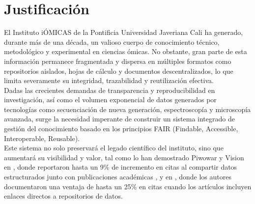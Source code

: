 \section{Justificación}
El Instituto iÓMICAS de la Pontificia Universidad Javeriana Cali ha generado, durante más de una década, un valioso cuerpo de conocimiento técnico, metodológico y experimental en ciencias ómicas. No obstante, gran parte de esta información permanece fragmentada y dispersa en múltiples formatos como repositorios aislados, hojas de cálculo y documentos descentralizados, lo que limita severamente su integridad, trazabilidad y reutilización efectiva.\\

Dadas las crecientes demandas de transparencia y reproducibilidad en investigación, así como el volumen exponencial de datos generados por tecnologías como secuenciación de nueva generación, espectroscopía y microscopía avanzada, surge la necesidad imperante de construir un sistema integrado de gestión del conocimiento basado en los principios FAIR (Findable, Accessible, Interoperable, Reusable).\\

Este sistema no solo preservará el legado científico del instituto, sino que aumentará su visibilidad y valor, tal como lo han demostrado Piwowar y Vision en \cite{piwowar2013data_reuse}, donde reportaron hasta un 9\% de incremento en citas al compartir datos estructurados junto con publicaciones académicas , y en \cite{colavizza2019citation_advantage}, donde los autores documentaron una ventaja de hasta un 25\% en citas cuando los artículos incluyen enlaces directos a repositorios de datos.

